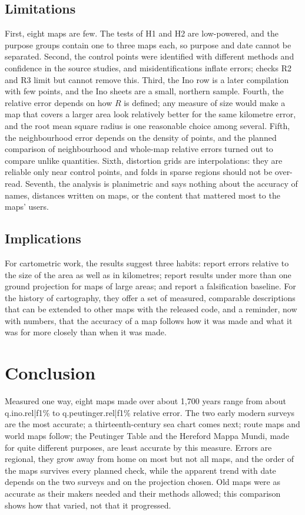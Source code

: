 \documentclass[11pt,a4paper]{article}
\begin{document}
\subsection{Limitations}
First, eight maps are few. The tests of H1 and H2 are low-powered, and the purpose groups contain one to three maps each, so purpose and date cannot be separated. Second, the control points were identified with different methods and confidence in the source studies, and misidentifications inflate errors; checks R2 and R3 limit but cannot remove this. Third, the Ino row is a later compilation with few points, and the Ino sheets are a small, northern sample. Fourth, the relative error depends on how $R$ is defined; any measure of size would make a map that covers a larger area look relatively better for the same kilometre error, and the root mean square radius is one reasonable choice among several. Fifth, the neighbourhood error depends on the density of points, and the planned comparison of neighbourhood and whole-map relative errors turned out to compare unlike quantities. Sixth, distortion grids are interpolations: they are reliable only near control points, and folds in sparse regions should not be over-read. Seventh, the analysis is planimetric and says nothing about the accuracy of names, distances written on maps, or the content that mattered most to the maps' users.

\subsection{Implications}
For cartometric work, the results suggest three habits: report errors relative to the size of the area as well as in kilometres; report results under more than one ground projection for maps of large areas; and report a falsification baseline. For the history of cartography, they offer a set of measured, comparable descriptions that can be extended to other maps with the released code, and a reminder, now with numbers, that the accuracy of a map follows how it was made and what it was for more closely than when it was made.

\section{Conclusion}\label{sec:conc}
Measured one way, eight maps made over about 1,700 years range from about {{q.ino.rel|f1}}\% to {{q.peutinger.rel|f1}}\% relative error. The two early modern surveys are the most accurate; a thirteenth-century sea chart comes next; route maps and world maps follow; the Peutinger Table and the Hereford Mappa Mundi, made for quite different purposes, are least accurate by this measure. Errors are regional, they grow away from home on most but not all maps, and the order of the maps survives every planned check, while the apparent trend with date depends on the two surveys and on the projection chosen. Old maps were as accurate as their makers needed and their methods allowed; this comparison shows how that varied, not that it progressed.
\end{document}
